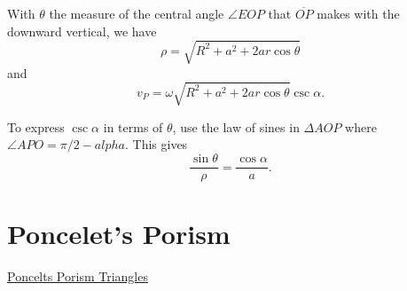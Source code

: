 \documentclass{ximera}
\begin{document}









With $\theta$ the measure of the central angle $\angle EOP$ that $\overline{OP}$ makes with the downward vertical, we have
\[
  \rho = \sqrt{R^2 + a^2 + 2ar \cos \theta}
\]
and 
\[
    v_P = \omega \sqrt{R^2 + a^2 + 2ar \cos \theta} \csc \alpha .
\]

To express $\csc\alpha$ in terms of $\theta$, use the law of sines in $\Delta AOP$ where $\angle APO = \pi/2 - alpha$. This gives
\[
    \frac{\sin\theta}{\rho} = \frac{\cos\alpha}{a}.
\]



\section*{Poncelet's Porism}


\begin{exploration}

\begin{onlineOnly}
    \begin{center}
\end{center}
\end{onlineOnly}

\href{https://www.desmos.com/calculator/0aihemcv0o}{Poncelts Porism Triangles}

\end{exploration}
\end{document}
